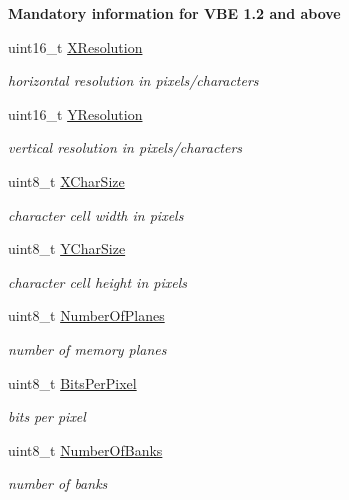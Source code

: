 \begin{Indent}{\bf Mandatory information for V\+BE 1.2 and above}\par
\begin{DoxyCompactItemize}
\item 
uint16\+\_\+t \hyperlink{structvbe__mode__info__t_a16f6408e5a85c7a7785a0cee64b6a219}{X\+Resolution}
\begin{DoxyCompactList}\small\item\em horizontal resolution in pixels/characters \end{DoxyCompactList}\item 
uint16\+\_\+t \hyperlink{structvbe__mode__info__t_afa8aba2156994750d500f85d0f8425cb}{Y\+Resolution}
\begin{DoxyCompactList}\small\item\em vertical resolution in pixels/characters \end{DoxyCompactList}\item 
uint8\+\_\+t \hyperlink{structvbe__mode__info__t_a047d8f41434f02589d0c9b90b17c67eb}{X\+Char\+Size}
\begin{DoxyCompactList}\small\item\em character cell width in pixels \end{DoxyCompactList}\item 
uint8\+\_\+t \hyperlink{structvbe__mode__info__t_a330f00ebd49dccd2325d43cdbd646f09}{Y\+Char\+Size}
\begin{DoxyCompactList}\small\item\em character cell height in pixels \end{DoxyCompactList}\item 
uint8\+\_\+t \hyperlink{structvbe__mode__info__t_a51268efaac55d78e17263aff9a447998}{Number\+Of\+Planes}
\begin{DoxyCompactList}\small\item\em number of memory planes \end{DoxyCompactList}\item 
uint8\+\_\+t \hyperlink{structvbe__mode__info__t_a03756ae144fce823087a2a4255bf4bb1}{Bits\+Per\+Pixel}
\begin{DoxyCompactList}\small\item\em bits per pixel \end{DoxyCompactList}\item 
uint8\+\_\+t \hyperlink{structvbe__mode__info__t_aa955c03441b6d3e55b2ba4be4dae56a2}{Number\+Of\+Banks}
\begin{DoxyCompactList}\small\item\em number of banks \end{DoxyCompactList}\item 

\end{DoxyCompactItemize}
\end{Indent}
